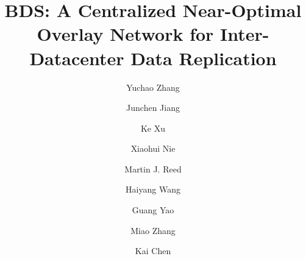 \documentclass[10pt,sigconf]{acmart}
\newcommand{\name}{BDS\xspace}
\begin{document}

\title[\name: A Centralized Near-Optimal Overlay Network for \\Inter-Datacenter Data Replication]{\name: A Centralized Near-Optimal Overlay Network for Inter-Datacenter Data Replication}

\author{Yuchao Zhang}

\author{Junchen Jiang}

\author{Ke Xu}

\author{Xiaohui Nie}

\author{Martin J. Reed}

\author{Haiyang Wang}

\author{Guang Yao}

\author{Miao Zhang}

\author{Kai Chen}

%
\end{document}
